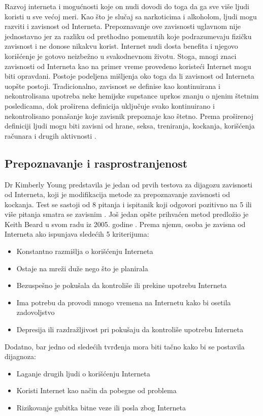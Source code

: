 \documentclass[a4paper]{article}
\begin{document}
Razvoj interneta i mogućnosti koje on nudi dovodi do toga da ga sve više ljudi koristi u sve većoj meri.
Kao što je slučaj sa narkoticima i alkoholom, ljudi mogu razviti i zavisnost od Interneta. Prepoznavanje ove zavisnosti uglavnom nije jednostavno jer za razliku od prethodno pomenutih koje podrazumevaju fizičku zavisnost i ne donose nikakvu korist. Internet nudi dosta benefita i njegovo korišćenje je gotovo neizbežno u svakodnevnom životu. Stoga, mnogi znaci zavisnosti od Interneta kao na primer vreme provedeno koristeći Internet mogu biti opravdani. Postoje podeljena mišljenja oko toga da li zavisnost od Interneta uopšte postoji. Tradicionalno, zavisnost se definise kao kontinuirana i nekontrolisana upotreba neke hemijske supstance uprkos znanju o njenim štetnim posledicama, dok proširena definicija uključuje svako  kontinuirano i nekontrolisano ponašanje koje zavisnik prepoznaje kao štetno. Prema proširenoj definiciji ljudi mogu biti zavisni od hrane, seksa, treniranja, kockanja, korišćenja računara i drugih aktivnosti \cite{ethics}.

\subsection{Prepoznavanje i rasprostranjenost}
\label{subsec:podnaslovZI1}

Dr Kimberly Young predstavila je jedan od prvih testova za dijagozu zavisnosti od Interneta, koji je modifikacija metode za prepoznavanje zavisnosti od kockanja. Test se sastoji od 8 pitanja i ispitanik koji odgovori pozitivno na 5 ili više pitanja smatra se zavisnim \cite{ethics}.
Još jedan opšte prihvaćen metod predložio je Keith Beard u svom radu iz 2005. godine \cite{diagnostic}. Prema njemu, osoba je zavisna od Interneta ako ispunjava sledećih 5 kriterijuma:
\begin{itemize}
  \item Konstantno razmišlja o korišćenju Interneta
  \item Ostaje na mreži duže nego što je planirala
  \item Bezuspešno je pokušala da kontroliše ili prekine upotrebu Interneta
  \item Ima potrebu da provodi mnogo vremena na Internetu kako bi osetila zadovoljstvo
  \item Depresija ili razdražljivost pri pokušaju da kontroliše upotrebu Interneta
\end{itemize}

Dodatno, bar jedno od sledećih tvrđenja mora biti tačno kako bi se postavila dijagnoza:
\begin{itemize}
  \item Laganje drugih ljudi o korišćenju Interneta
  \item Koristi Internet kao način da pobegne od problema
  \item Rizikovanje gubitka bitne veze ili posla zbog Interneta
\end{itemize}
\end{document}
